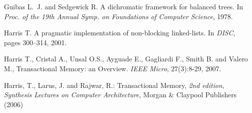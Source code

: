 \begin{thebibliography}{99}
{%





Guibas L.~J.  and Sedgewick R.
\newblock A dichromatic framework for balanced trees.
\newblock In {\em Proc. of the 19th Annual Symp. on Foundations of Computer
  Science}, 1978.


Harris T.
\newblock A pragmatic implementation of non-blocking linked-lists.
\newblock In {\em DISC}, pages 300--314, 2001.






Harris T., Cristal  A., Unsal O.S., Ayguade E., Gagliardi  F., Smith B. and
Valero M., 
Transactional Memory: an Overview. 
{\it IEEE Micro}, 27(3):8-29, 2007. 


% 
% 



 Harris, T.,  Larus, J. and  Rajwar, R.:
Transactional Memory, 
{\it 2nd edition, Synthesis Lectures on Computer Architecture},
Morgan \& Claypool Publishers (2006)



}
\end{thebibliography}
